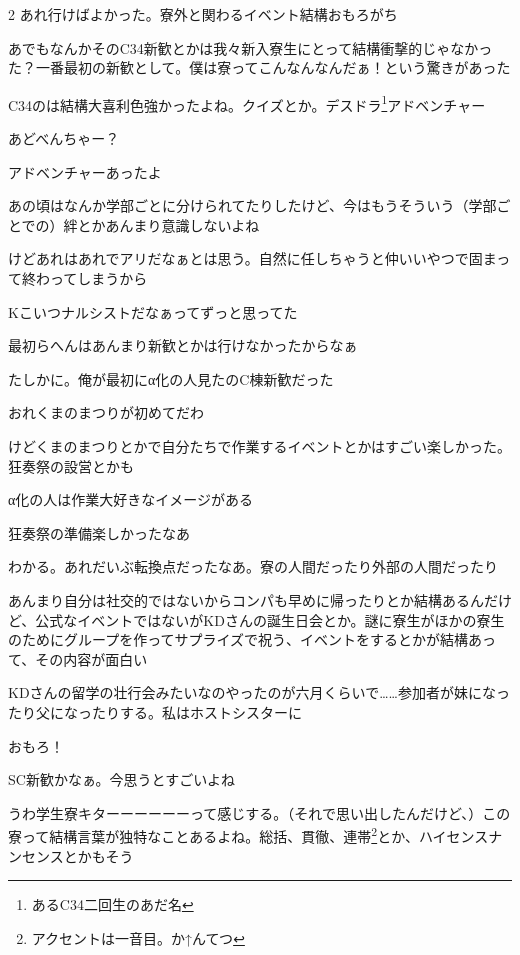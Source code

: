 \begin{multicols}{2}
 あれ行けばよかった。寮外と関わるイベント結構おもろがち

 あでもなんかそのC34新歓とかは我々新入寮生にとって結構衝撃的じゃなかった？一番最初の新歓として。僕は寮ってこんなんなんだぁ！という驚きがあった

 C34のは結構大喜利色強かったよね。クイズとか。デスドラ\footnote{あるC34二回生のあだ名}アドベンチャー

 あどべんちゃー？

 アドベンチャーあったよ

 あの頃はなんか学部ごとに分けられてたりしたけど、今はもうそういう（学部ごとでの）絆とかあんまり意識しないよね

 けどあれはあれでアリだなぁとは思う。自然に任しちゃうと仲いいやつで固まって終わってしまうから

 Kこいつナルシストだなぁってずっと思ってた

 最初らへんはあんまり新歓とかは行けなかったからなぁ

 たしかに。俺が最初にα化の人見たのC棟新歓だった

 おれくまのまつりが初めてだわ

 けどくまのまつりとかで自分たちで作業するイベントとかはすごい楽しかった。狂奏祭の設営とかも

 α化の人は作業大好きなイメージがある

 狂奏祭の準備楽しかったなあ

 わかる。あれだいぶ転換点だったなあ。寮の人間だったり外部の人間だったり

 あんまり自分は社交的ではないからコンパも早めに帰ったりとか結構あるんだけど、公式なイベントではないがKDさんの誕生日会とか。謎に寮生がほかの寮生のためにグループを作ってサプライズで祝う、イベントをするとかが結構あって、その内容が面白い

 KDさんの留学の壮行会みたいなのやったのが六月くらいで……参加者が妹になったり父になったりする。私はホストシスターに

 おもろ！

 SC新歓かなぁ。今思うとすごいよね

 うわ学生寮キターーーーーーって感じする。（それで思い出したんだけど、）この寮って結構言葉が独特なことあるよね。総括、貫徹、連帯\footnote{アクセントは一音目。か↑んてつ}とか、ハイセンスナンセンスとかもそう


\end{multicols}
